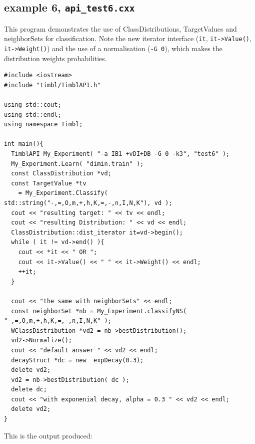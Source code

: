 \documentclass{report}
\begin{document}
\subsection{example 6, {\tt api\_test6.cxx}}

This program demonstrates the use of ClassDistributions, TargetValues
and neighborSets for classification. Note the new iterator interface
({\tt *it}, {\tt it->Value()}, {\tt it->Weight()}) and the use of a
normalisation ({\tt -G 0}), which makes the distribution weights
probabilities.

\begin{footnotesize}
\begin{verbatim}
#include <iostream>
#include "timbl/TimblAPI.h"

using std::cout;
using std::endl;
using namespace Timbl;

int main(){
  TimblAPI My_Experiment( "-a IB1 +vDI+DB -G 0 -k3", "test6" );
  My_Experiment.Learn( "dimin.train" );
  const ClassDistribution *vd;
  const TargetValue *tv
    = My_Experiment.Classify( std::string("-,=,O,m,+,h,K,=,-,n,I,N,K"), vd );
  cout << "resulting target: " << tv << endl;
  cout << "resulting Distribution: " << vd << endl;
  ClassDistribution::dist_iterator it=vd->begin();
  while ( it != vd->end() ){
    cout << *it << " OR ";
    cout << it->Value() << " " << it->Weight() << endl;
    ++it;
  }

  cout << "the same with neighborSets" << endl;
  const neighborSet *nb = My_Experiment.classifyNS( "-,=,O,m,+,h,K,=,-,n,I,N,K" );
  WClassDistribution *vd2 = nb->bestDistribution();
  vd2->Normalize();
  cout << "default answer " << vd2 << endl;
  decayStruct *dc = new  expDecay(0.3);
  delete vd2;
  vd2 = nb->bestDistribution( dc );
  delete dc;
  cout << "with exponenial decay, alpha = 0.3 " << vd2 << endl;
  delete vd2;
}
\end{verbatim}
\end{footnotesize}

This is the output produced:
\end{document}
